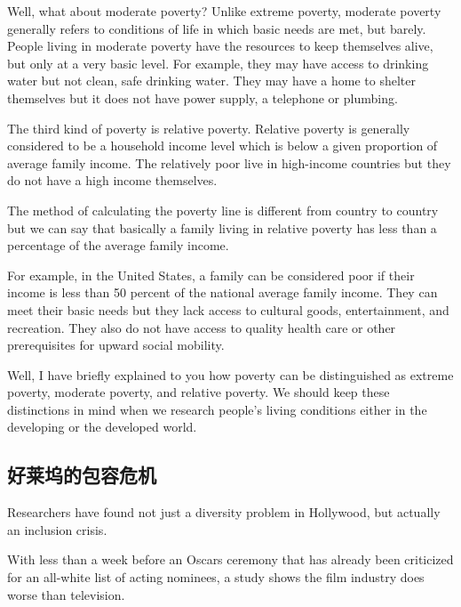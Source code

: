 Well, what about moderate poverty? Unlike extreme poverty, moderate poverty generally refers to conditions of life in which basic needs are met, but barely. People living in moderate poverty have the resources to keep themselves alive, but only at a very basic level. For example, they may have access to drinking water but not clean, safe drinking water. They may have a home to shelter themselves but it does not have power supply, a telephone or plumbing.

The third kind of poverty is relative poverty. Relative poverty is generally considered to be a household income level which is below a given proportion of average family income. The relatively poor live in high-income countries but they do not have a high income themselves.

The method of calculating the poverty line is different from country to country but we can say that basically a family living in relative poverty has less than a percentage of the average family income.

For example, in the United States, a family can be considered poor if their income is less than 50 percent of the national average family income. They can meet their basic needs but they lack access to cultural goods, entertainment, and recreation. They also do not have access to quality health care or other prerequisites for upward social mobility.

Well, I have briefly explained to you how poverty can be distinguished as extreme poverty, moderate poverty, and relative poverty. We should keep these distinctions in mind when we research people's living conditions either in the developing or the developed world.

\subsection{好莱坞的包容危机}
\begin{margintable}\vspace{-2cm}\footnotesize
\end{margintable}
Researchers have found not just a diversity problem in Hollywood, but actually an inclusion crisis.

With less than a week before an Oscars ceremony that has already been criticized for an all-white list of acting nominees, a study shows the film industry does worse than television.

